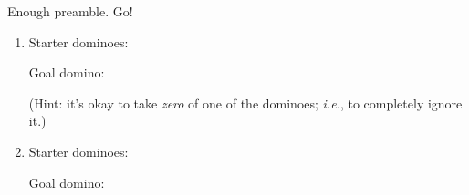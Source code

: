 Enough preamble. Go!

\begin{enumerate}
\itemsep2em

\label{startDominoPuzzles}
\item Starter dominoes:
\hspace{.3in}
\hspace{.1in}

Goal domino:
\hspace{1.1in}

\footnotesize
(Hint: it's okay to take \textit{zero} of one of the dominoes; \textit{i.e.},
to completely ignore it.)
\normalsize

\item Starter dominoes:
\hspace{.3in}
\hspace{.1in}

Goal domino:
\hspace{1.1in}


\end{enumerate}
